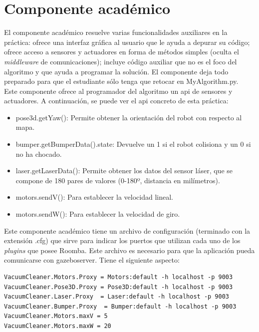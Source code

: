 \section{Componente académico}
El componente académico resuelve varias funcionalidades auxiliares en la práctica: ofrece una interfaz gráfica al usuario que le ayuda a depurar su código; ofrece acceso a sensores y actuadores en forma de métodos simples (oculta el \textit{middleware} de comunicaciones); incluye código auxiliar que no es el foco del algoritmo y que ayuda a programar la solución. El componente deja todo preparado para que el estudiante sólo tenga que retocar en MyAlgorithm.py.\\

Este componente ofrece al programador del algoritmo un \acrshort{api} de sensores y actuadores. A continuación, se puede ver el \acrshort{api} concreto de esta práctica:

\begin{itemize}
\item pose3d.getYaw(): Permite obtener la orientación del robot con respecto al mapa.
\item bumper.getBumperData().state: Devuelve un 1 si el robot colisiona y un 0 si no ha chocado.
\item laser.getLaserData(): Permite obtener los datos del sensor láser, que se compone de 180 pares de valores (0-180º, distancia en milímetros).
\item motors.sendV(): Para establecer la velocidad lineal.
\item motors.sendW(): Para establecer la velocidad de giro.

\end{itemize}


Este componente académico tiene un archivo de configuración (terminado con la extensión .cfg) que sirve para indicar los puertos que utilizan cada uno de los \textit{plugins} que posee Roomba. Este archivo es necesario para que la aplicación pueda comunicarse con gazeboserver. Tiene el siguiente aspecto: 


\vspace{20pt}
	\begin{lstlisting}[frame=single]
VacuumCleaner.Motors.Proxy = Motors:default -h localhost -p 9003
VacuumCleaner.Pose3D.Proxy = Pose3D:default -h localhost -p 9003
VacuumCleaner.Laser.Proxy  = Laser:default -h localhost -p 9003
VacuumCleaner.Bumper.Proxy  = Bumper:default -h localhost -p 9003
VacuumCleaner.Motors.maxV = 5
VacuumCleaner.Motors.maxW = 20

	\end{lstlisting}
	
